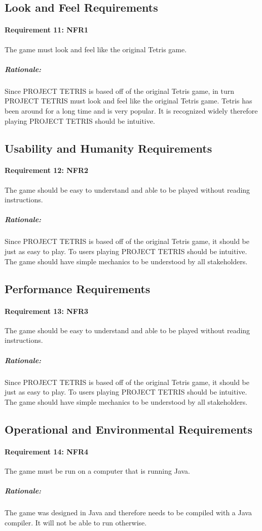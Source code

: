 \documentclass[12pt, titlepage]{article}
\begin{document}
\subsection{Look and Feel Requirements}
\paragraph{Requirement 11: NFR1}
The game must look and feel like the original Tetris game. 
\subparagraph{Rationale:}
Since PROJECT TETRIS is based off of the original Tetris game, in turn PROJECT TETRIS must look and feel like the original Tetris game. Tetris has been around for a long time and is very popular. It is recognized widely therefore playing PROJECT TETRIS should be intuitive.

\subsection{Usability and Humanity Requirements}
\paragraph{Requirement 12: NFR2}
The game should be easy to understand and able to be played without reading instructions.
\subparagraph{Rationale:}
Since PROJECT TETRIS is based off of the original Tetris game, it should be just as easy to play. To users playing PROJECT TETRIS should be intuitive. The game should have simple mechanics to be understood by all stakeholders.

\subsection{Performance Requirements}
\paragraph{Requirement 13: NFR3}
The game should be easy to understand and able to be played without reading instructions.
\subparagraph{Rationale:}
Since PROJECT TETRIS is based off of the original Tetris game, it should be just as easy to play. To users playing PROJECT TETRIS should be intuitive. The game should have simple mechanics to be understood by all stakeholders.

\subsection{Operational and Environmental Requirements}
\paragraph{Requirement 14: NFR4}
The game must be run on a computer that is running Java.
\subparagraph{Rationale:}
The game was designed in Java and therefore needs to be compiled with a Java compiler. It will not be able to run otherwise.
\end{document}

